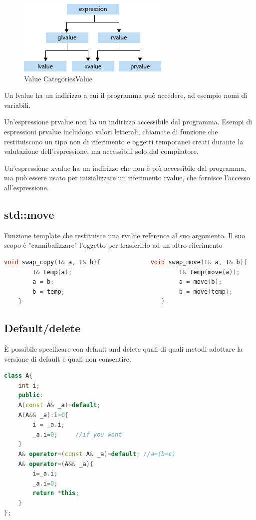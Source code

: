 \begin{figure}[h]
    \centering
    \includegraphics[width=0.4 \textwidth]{img/value.png}
    \caption{Value CategoriesValue}
\end{figure}

Un lvalue ha un indirizzo a cui il programma può accedere, ad esempio nomi di variabili.

Un'espressione prvalue non ha un indirizzo accessibile dal programma. Esempi di espressioni prvalue includono valori letterali, chiamate di funzione che restituiscono un tipo non di riferimento e oggetti temporanei creati durante la valutazione dell'espressione, ma accessibili solo dal compilatore.

Un'espressione xvalue ha un indirizzo che non è più accessibile dal programma, ma può essere usato per inizializzare un riferimento rvalue, che fornisce l'accesso all'espressione. 

\subsection{std::move}
Funzione template che restituisce una rvalue reference al suo argomento. Il suo scopo è "cannibalizzare" l'oggetto per trasferirlo ad un altro riferimento

\begin{lstlisting}[language=c++]
    void swap_copy(T& a, T& b){              void swap_move(T& a, T& b){  
        T& temp(a);                              T& temp(move(a));
        a = b;                                   a = move(b);
        b = temp;                                b = move(temp);
    }                                       }
\end{lstlisting}


\subsection{Default/delete}

È possibile specificare con default and delete
quali di quali metodi adottare la versione di default
e quali non consentire.

\begin{lstlisting}[language=c++]
class A{
    int i;
    public:
    A(const A& _a)=default;
    A(A&& _a):i=0{
        i = _a.i;
        _a.i=0;     //if you want
    }
    A& operator=(const A& _a)=default; //a=(b=c)
    A& operator=(A&& _a){
        i=_a.i;
        _a.i=0;
        return *this;
    }
}; 

\end{lstlisting}